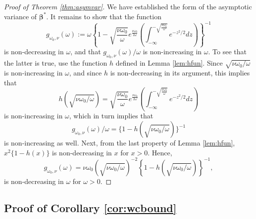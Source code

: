 \documentclass[12pt]{article}
\newcommand{\bs}[1]{\boldsymbol #1}
\begin{document}
\begin{proof}[Proof of Theorem \ref{thm:asymvar}]
We have established the form of the asymptotic variance of $\bs{\beta}^*$. It remains to show that the function
\begin{equation*}
    g_{\omega_0, \nu}(\omega) := \omega \left\{1-\sqrt{\frac{\nu \omega_0}{\omega}} e^{\frac{\nu \omega_0}{2\omega}} \left( \int_{-\infty}^{-\sqrt{\frac{\nu \omega_0}{\omega}}} e^{-z^2/2} dz\right) \right\}^{-1}
\end{equation*}
is non-decreasing in $\omega$, and that $g_{\omega_0, \nu}(\omega)/\omega$ is non-increasing in $\omega$. To see that the latter is true, use the function $h$ defined in Lemma \ref{lem:hfun}. Since $\sqrt{\nu \omega_0 / \omega}$ is non-increasing in $\omega$, and since $h$ is non-decreasing in its argument, this implies that 
\begin{equation*}
    h(\sqrt{\nu \omega_0 / \omega}) = \sqrt{\frac{\nu \omega_0}{\omega}} e^{\frac{\nu \omega_0}{2\omega}} \left( \int_{-\infty}^{-\sqrt{\frac{\nu \omega_0}{\omega}}} e^{-z^2/2} dz\right)
\end{equation*}
is non-increasing in $\omega$, which in turn implies that
\begin{equation*}
    g_{\omega_0, \nu}(\omega)/\omega = \{1 - h(\sqrt{\nu \omega_0 / \omega})\}^{-1}
\end{equation*}
is non-increasing as well. Next, from the last property of Lemma \ref{lem:hfun}, $x^2\{1 - h(x)\}$ is non-decreasing in $x$ for $x > 0$. Hence,
\begin{equation*}
    g_{\omega_0, \nu}(\omega) = \nu \omega_0 (\sqrt{\nu \omega_0/\omega})^{-2} \left\{1 - h(\sqrt{\nu \omega_0/\omega})\right\}^{-1},
\end{equation*}
is non-decreasing in $\omega$ for $\omega > 0$.

\end{proof}

\subsection{{Proof of Corollary \ref{cor:wcbound}}}
\end{document}
